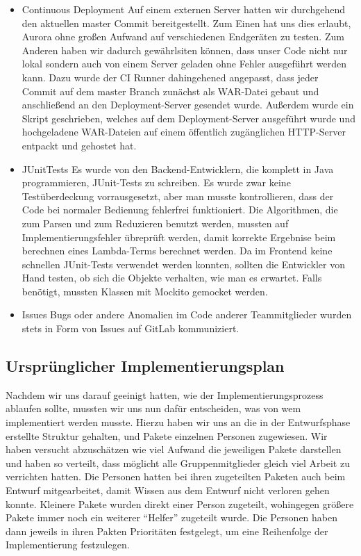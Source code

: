 \documentclass[parskip=full,11pt,twoside]{scrartcl}
\begin{document}
\begin{itemize}
    \item Continuous Deployment
        \newline
        Auf einem externen Server hatten wir durchgehend den aktuellen master Commit bereitgestellt.
        Zum Einen hat uns dies erlaubt, Aurora ohne großen Aufwand auf verschiedenen Endgeräten zu testen.
        Zum Anderen haben wir dadurch gewährlsiten können, dass unser Code nicht nur lokal sondern auch von einem Server geladen ohne Fehler ausgeführt werden kann.
		Dazu wurde der CI Runner dahingehened angepasst, dass jeder Commit auf dem master Branch zunächst als WAR-Datei
		gebaut und anschließend an den Deployment-Server gesendet wurde.
		Außerdem wurde ein Skript geschrieben, welches auf dem Deployment-Server ausgeführt wurde und hochgeladene
		WAR-Dateien auf einem öffentlich zugänglichen HTTP-Server entpackt und gehostet hat.

       \item JUnitTests
       \newline
      	Es wurde von den Backend-Entwicklern, die komplett in Java programmieren, JUnit-Tests zu schreiben.
      	Es wurde zwar keine Testüberdeckung vorrausgesetzt, aber man musste kontrollieren, dass der Code bei normaler Bedienung fehlerfrei funktioniert.
      	Die Algorithmen, die zum Parsen und zum Reduzieren benutzt werden, mussten auf Implementierungsfehler übreprüft werden, damit korrekte Ergebnise beim berechnen eines Lambda-Terms berechnet werden.
      	Da im Frontend keine schnellen JUnit-Tests verwendet werden konnten, sollten die Entwickler von Hand testen, ob sich die Objekte verhalten, wie man es erwartet.
      	Falls benötigt, mussten Klassen mit Mockito gemocket werden.
      	\item Issues
      	Bugs oder andere Anomalien im Code anderer Teammitglieder wurden stets in Form von Issues auf GitLab kommuniziert.
      	\end{itemize}

\subsection{Ursprünglicher Implementierungsplan}
Nachdem wir uns darauf geeinigt hatten, wie der Implementierungsprozess ablaufen sollte, mussten wir uns nun dafür entscheiden, was von wem implementiert werden musste.
Hierzu haben wir uns an die in der Entwurfsphase erstellte Struktur gehalten, und Pakete einzelnen Personen zugewiesen.
Wir haben versucht abzuschätzen wie viel Aufwand die jeweiligen Pakete darstellen und haben so verteilt, dass möglicht alle Gruppenmitglieder gleich viel Arbeit zu verrichten hatten.
Die Personen hatten bei ihren zugeteilten Paketen auch beim Entwurf mitgearbeitet, damit Wissen aus dem Entwurf nicht verloren gehen konnte.
Kleinere Pakete wurden direkt einer Person zugeteilt, wohingegen größere Pakete immer noch ein weiterer \enquote{Helfer} zugeteilt wurde.
Die Personen haben dann jeweils in ihren Pakten Prioritäten festgelegt, um eine Reihenfolge der Implementierung festzulegen.
\end{document}
